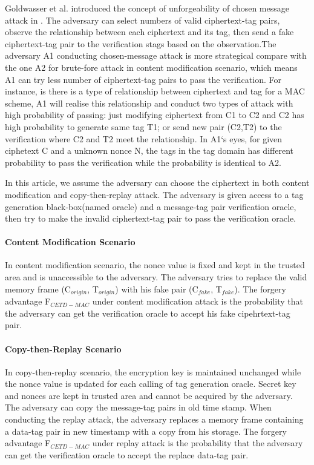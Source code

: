\documentclass{article}
\begin{document}
Goldwasser et al. introduced the concept of unforgeability of chosen message attack in \cite{}. The adversary can select numbers of valid ciphertext-tag pairs, observe the relationship between each ciphertext and its tag, then send a fake ciphertext-tag pair to the verification stags based on the observation.The adversary A1 conducting chosen-message attack is more strategical compare with the one A2 for brute-fore attack in content modification scenario, which means A1 can try less number of ciphertext-tag pairs to pass the verification. 
For instance, is there is a type of relationship between ciphertext and tag for a MAC scheme, A1 will realise this relationship and conduct two types of attack with high probability of passing: just modifying ciphertext from C1 to C2 and C2 has high probability to generate same tag T1; or send new pair (C2,T2) to the verification where C2 and T2 meet the relationship. In A1`s eyes, for given ciphetext C and a unknown nonce N, the tags in the tag domain has different probability to pass the verification while the probability is identical to A2. 

In this article, we assume the adversary can choose the ciphertext in both content modification and copy-then-replay attack. The adversary is given access to a tag generation black-box(named oracle) and a message-tag pair verification oracle, then try to make the invalid ciphertext-tag pair to pass the verification oracle.
\paragraph{Content Modification Scenario}
In content modification scenario, the nonce value is fixed and kept in the trusted area and is unaccessible to the adversary. The adversary tries to replace the valid memory frame (C$_{origin}$, T$_{origin}$) with his fake pair (C$_{fake}$, T$_{fake}$). The forgery advantage F$_{CETD-MAC}$ under content modification attack is the probability that the adversary can get the verification oracle to accept his fake cipehrtext-tag pair. 
\paragraph{Copy-then-Replay Scenario}
In copy-then-replay scenario, the encryption key is maintained unchanged while the nonce value is updated for each calling of tag generation oracle. Secret key and nonces are kept in trusted area and cannot be acquired by the adversary. The adversary can copy the message-tag pairs in old time stamp. When conducting the replay attack, the adversary replaces a memory frame containing a data-tag pair in new timestamp with a copy from his storage. The forgery advantage F$_{CETD-MAC}$ under replay attack is the probability that the adversary can get the verification oracle to accept the replace data-tag pair.  
\end{document}
